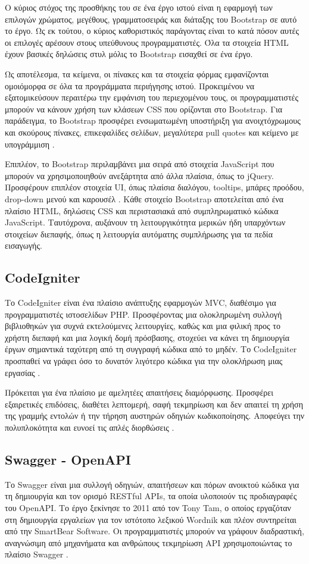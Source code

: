 Ο κύριος στόχος της προσθήκης του σε ένα έργο ιστού είναι η εφαρμογή των επιλογών χρώματος, μεγέθους, γραμματοσειράς και διάταξης του Bootstrap σε αυτό το έργο. Ως εκ τούτου, ο κύριος καθοριστικός παράγοντας είναι το κατά πόσον αυτές οι επιλογές αρέσουν στους υπεύθυνους προγραμματιστές. Όλα τα στοιχεία HTML έχουν βασικές δηλώσεις στυλ μόλις το Bootstrap εισαχθεί σε ένα έργο. 

Ως αποτέλεσμα, τα κείμενα, οι πίνακες και τα στοιχεία φόρμας εμφανίζονται ομοιόμορφα σε όλα τα προγράμματα περιήγησης ιστού. Προκειμένου να εξατομικεύσουν περαιτέρω την εμφάνιση του περιεχομένου τους, οι προγραμματιστές μπορούν να κάνουν χρήση των κλάσεων CSS που ορίζονται στο Bootstrap. Για παράδειγμα, το Bootstrap προσφέρει ενσωματωμένη υποστήριξη για ανοιχτόχρωμους και σκούρους πίνακες, επικεφαλίδες σελίδων, μεγαλύτερα pull quotes και κείμενο με υπογράμμιση \cite{bootstrap_2}.

Επιπλέον, το Bootstrap περιλαμβάνει μια σειρά από στοιχεία JavaScript που μπορούν να χρησιμοποιηθούν ανεξάρτητα από άλλα πλαίσια, όπως το jQuery. Προσφέρουν επιπλέον στοιχεία UI, όπως πλαίσια διαλόγου, tooltips, μπάρες προόδου, drop-down μενού και καρουσέλ \cite{gaikwad2019review}. Κάθε στοιχείο Bootstrap αποτελείται από ένα πλαίσιο HTML, δηλώσεις CSS και περιστασιακά από συμπληρωματικό κώδικα JavaScript. Ταυτόχρονα, αυξάνουν τη λειτουργικότητα μερικών ήδη υπαρχόντων στοιχείων διεπαφής, όπως η λειτουργία αυτόματης συμπλήρωσης για τα πεδία εισαγωγής.

\subsection{CodeIgniter}
Το CodeIgniter είναι ένα πλαίσιο ανάπτυξης εφαρμογών MVC, διαθέσιμο για προγραμματιστές ιστοσελίδων PHP. Προσφέροντας μια ολοκληρωμένη συλλογή βιβλιοθηκών για συχνά εκτελούμενες λειτουργίες, καθώς και μια φιλική προς το χρήστη διεπαφή και μια λογική δομή πρόσβασης, στοχεύει να κάνει τη δημιουργία έργων σημαντικά ταχύτερη από τη συγγραφή κώδικα από το μηδέν. Το CodeIgniter προσπαθεί να γράφει όσο το δυνατόν λιγότερο κώδικα για την ολοκλήρωση μιας εργασίας \cite{Jackson_2020}.

Πρόκειται για ένα πλαίσιο με αμελητέες απαιτήσεις διαμόρφωσης. Προσφέρει εξαιρετικές επιδόσεις, διαθέτει λεπτομερή, σαφή τεκμηρίωση και δεν απαιτεί τη χρήση της γραμμής εντολών ή την τήρηση αυστηρών οδηγιών κωδικοποίησης. Αποφεύγει την πολυπλοκότητα και ευνοεί τις απλές διορθώσεις \cite{CodeIgniter_intro}.

\subsection{Swagger - OpenAPI}
Το Swagger είναι μια συλλογή οδηγιών, απαιτήσεων και πόρων ανοικτού κώδικα για τη δημιουργία και τον ορισμό RESTful APIs, τα οποία υλοποιούν τις προδιαγραφές του OpenAPI. Το έργο ξεκίνησε το 2011 από τον Tony Tam, ο οποίος εργαζόταν στη δημιουργία εργαλείων για τον ιστότοπο λεξικού Wordnik και πλέον συντηρείται από την SmartBear Software. Οι προγραμματιστές μπορούν να γράφουν διαδραστική, αναγνώσιμη από μηχανήματα και ανθρώπους τεκμηρίωση API χρησιμοποιώντας το πλαίσιο Swagger \cite{Swagger_2022}.

